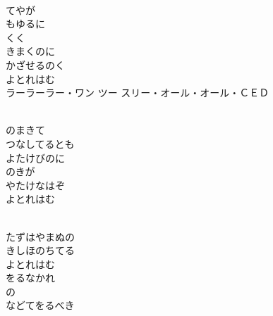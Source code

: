 \documentclass[10pt,b5j]{tarticle} %
\begin{document}
\vspace{1.5em} %
\newcommand{\linespace}{0.5em} %
\newcommand{\blocksize}{0.5\hsize} %
\newcommand{\itemmargin}{3em} %
\begin{enumerate} %
    \setlength{\itemindent}{\itemmargin} %
    \begin{minipage}[c]{\blocksize}
    
        \vspace{\linespace}
        \item~\\
        てやが\\
        もゆるに\\
        くく\\
        きまくのに\\
        かざせるのく\\
        よとれはむ\\
        ラーラーラー・ワン ツー スリー・オール・オール・ＣＥＤ
        
    \end{minipage}
    \begin{minipage}[c]{\blocksize}
        
        \vspace{\linespace}
        \item~\\
        のまきて\\
        つなしてるとも\\
        よたけびのに\\
        のきが\\
        やたけなはぞ\\
        よとれはむ
        
    \end{minipage}
    \begin{minipage}[c]{\blocksize}
        
        \vspace{\linespace}
        \item~\\
        たずはやまぬの\\
        きしほのちてる\\
        よとれはむ\\
        をるなかれ\\
        の\\
        などてをるべき
    
    \end{minipage}
\end{enumerate} %
\end{document}
